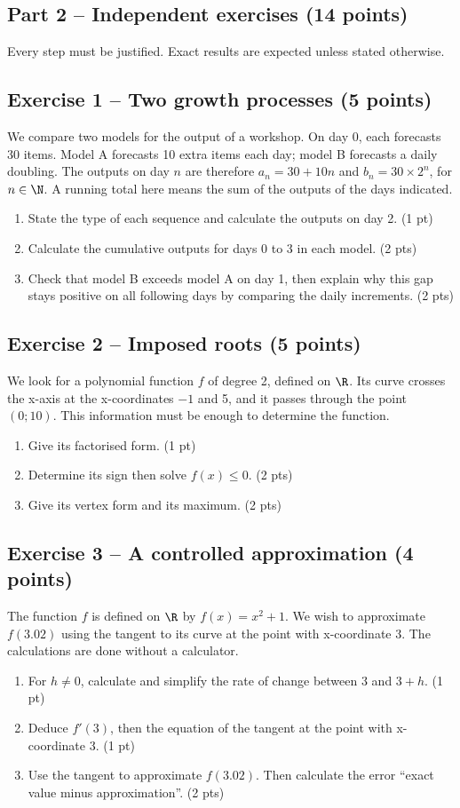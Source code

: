 \mxnewpage\subsection*{Part 2 -- Independent exercises (14 points)}
Every step must be justified. Exact results are expected unless stated otherwise.
\subsection*{Exercise 1 -- Two growth processes (5 points)}
We compare two models for the output of a workshop. On day 0, each forecasts 30 items. Model A forecasts 10 extra items each day; model B forecasts a daily doubling. The outputs on day $n$ are therefore $a_n=30+10n$ and $b_n=30\times2^n$, for $n\in\N$. A running total here means the sum of the outputs of the days indicated.
\begin{enumerate}
\item State the type of each sequence and calculate the outputs on day 2. \hfill(1 pt)
\item Calculate the cumulative outputs for days 0 to 3 in each model. \hfill(2 pts)
\item Check that model B exceeds model A on day 1, then explain why this gap stays positive on all following days by comparing the daily increments. \hfill(2 pts)
\end{enumerate}
\subsection*{Exercise 2 -- Imposed roots (5 points)}
We look for a polynomial function $f$ of degree 2, defined on $\R$. Its curve crosses the x-axis at the x-coordinates $-1$ and 5, and it passes through the point $(0;10)$. This information must be enough to determine the function.
\begin{enumerate}
\item Give its factorised form. \hfill(1 pt)
\item Determine its sign then solve $f(x)\leq0$. \hfill(2 pts)
\item Give its vertex form and its maximum. \hfill(2 pts)
\end{enumerate}
\subsection*{Exercise 3 -- A controlled approximation (4 points)}
The function $f$ is defined on $\R$ by $f(x)=x^2+1$. We wish to approximate $f(3.02)$ using the tangent to its curve at the point with x-coordinate 3. The calculations are done without a calculator.
\begin{enumerate}
\item For $h\ne0$, calculate and simplify the rate of change between 3 and $3+h$. \hfill(1 pt)
\item Deduce $f\prime(3)$, then the equation of the tangent at the point with x-coordinate 3. \hfill(1 pt)
\item Use the tangent to approximate $f(3.02)$. Then calculate the error ``exact value minus approximation''. \hfill(2 pts)
\end{enumerate}
